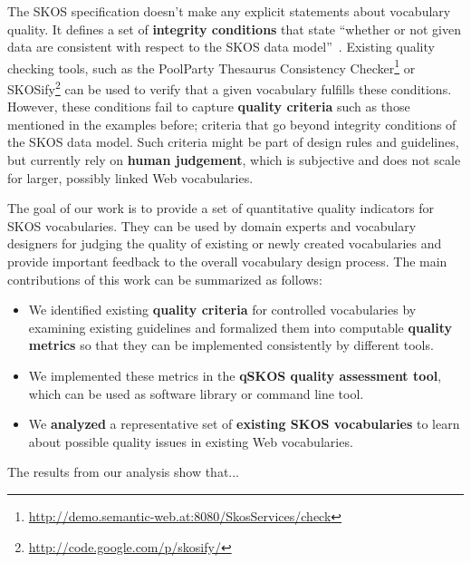 
The SKOS specification doesn't make any explicit statements about vocabulary quality. It defines a set of \textbf{integrity conditions} that state ``whether or not given data are consistent with respect to the SKOS data model''~\cite{Miles2005}. Existing quality checking tools, such as the PoolParty Thesaurus Consistency Checker\footnote{\url{http://demo.semantic-web.at:8080/SkosServices/check}} or SKOSify\footnote{\url{http://code.google.com/p/skosify/}} can be used to verify that a given vocabulary fulfills these conditions. However, these conditions fail to capture \textbf{quality criteria} such as those mentioned in the examples before; criteria that go beyond integrity conditions of the SKOS data model. Such criteria might be part of design rules and guidelines, but currently rely on \textbf{human judgement}, which is subjective and does not scale for larger, possibly linked Web vocabularies.


The goal of our work is to provide a set of quantitative quality indicators for SKOS vocabularies. They can be used by domain experts and vocabulary designers for judging the quality of existing or newly created vocabularies and provide important feedback to the overall vocabulary design process. The main contributions of this work can be summarized as follows:

\begin{itemize}

	\item We identified existing \textbf{quality criteria} for controlled vocabularies by examining existing guidelines and formalized them into computable \textbf{quality metrics} so that they can be implemented consistently by different tools.
	
	\item We implemented these metrics in the \textbf{qSKOS quality assessment tool}, which can be used as software library or command line tool.

	\item We \textbf{analyzed} a representative set of \textbf{existing SKOS vocabularies} to learn about possible quality issues in existing Web vocabularies.

\end{itemize}

The results from our analysis show that... 
